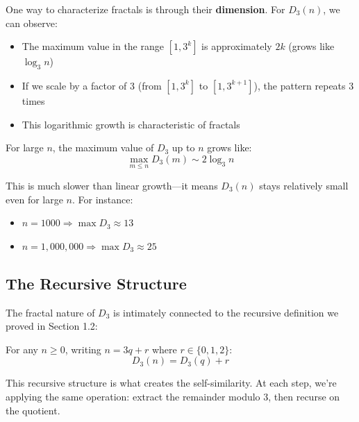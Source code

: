 One way to characterize fractals is through their \textbf{dimension}. For $D_3(n)$, we can observe:

\begin{itemize}
\item The maximum value in the range $[1, 3^k]$ is approximately $2k$ (grows like $\log_3 n$)
\item If we scale by a factor of 3 (from $[1, 3^k]$ to $[1, 3^{k+1}]$), the pattern repeats 3 times
\item This logarithmic growth is characteristic of fractals
\end{itemize}

\begin{keyidea}
For large $n$, the maximum value of $D_3$ up to $n$ grows like:
\begin{equation}
\max_{m \leq n} D_3(m) \sim 2 \log_3 n
\end{equation}

This is much slower than linear growth—it means $D_3(n)$ stays relatively small even for large $n$. For instance:
\begin{itemize}
\item $n = 1000 \Rightarrow \max D_3 \approx 13$
\item $n = 1{,}000{,}000 \Rightarrow \max D_3 \approx 25$
\end{itemize}
\end{keyidea}

\subsection{The Recursive Structure}
\label{subsec:recursive-structure}


The fractal nature of $D_3$ is intimately connected to the recursive definition we proved in Section 1.2:

\begin{theorem}
\label{thm:d3-recursive-fractal}
For any $n \geq 0$, writing $n = 3q + r$ where $r \in \{0, 1, 2\}$:
\begin{equation}
D_3(n) = D_3(q) + r
\end{equation}
\end{theorem}

This recursive structure is what creates the self-similarity. At each step, we're applying the same operation: extract the remainder modulo 3, then recurse on the quotient.

